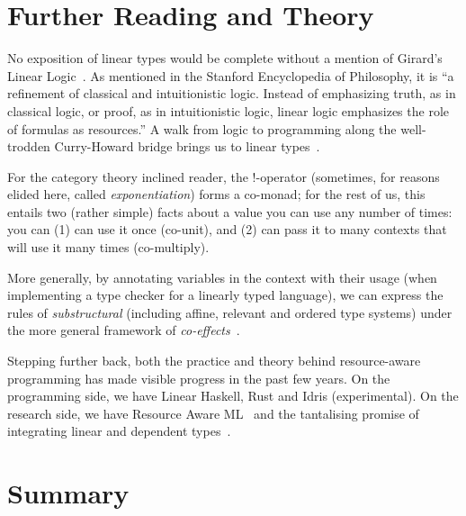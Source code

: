 \section{Further Reading and Theory}\label{sec:further}


No exposition of linear types would be complete without a mention of Girard's
Linear Logic~\cite{girard}. As mentioned in the Stanford Encyclopedia of
Philosophy, it is ``a refinement of classical and intuitionistic logic. Instead
of emphasizing truth, as in classical logic, or proof, as in intuitionistic
logic, linear logic emphasizes the role of formulas as resources.'' A walk from
logic to programming along the well-trodden Curry-Howard bridge brings us to
linear types~\cite{wadler}.

For the category theory inclined reader, the !-operator (sometimes, for reasons
elided here, called \emph{exponentiation}) forms a co-monad; for the rest of
us, this entails two (rather simple) facts about a value you can use any number
of times: you can (1) can use it once (co-unit), and (2) can pass it to many
contexts that will use it many times (co-multiply).

More generally, by annotating variables in the context with their usage (when
implementing a type checker for a linearly typed language), we can express the
rules of \emph{substructural} (including affine, relevant and ordered type
systems) under the more general framework of \emph{co-effects}~\cite{petricek}.

Stepping further back, both the practice and theory behind resource-aware
programming has made visible progress in the past few years.  On the
programming side, we have Linear Haskell, Rust and Idris (experimental). On the
research side, we have Resource Aware ML~\cite{hoffmann} and the tantalising
promise of integrating linear and dependent types~\cite{atkey}.

\newpage%
\section{Summary}

